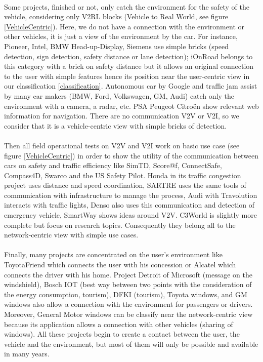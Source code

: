 \documentclass[a4paper]{article}
\begin{document}
\paragraph{}Some projects, finished or not, only catch the environment for the safety of the vehicle, considering only V2RL blocks (Vehicle to Real World, see figure \ref{VehicleCentric}). Here, we do not have a connection with the environment or other vehicles, it is just a view of the environment by the car. For instance, Pioneer, Intel, BMW Head-up-Display, Siemens use simple bricks (speed detection, sign detection, safety distance or lane detection); iOnRoad belongs to this category with a brick on safety distance but it allows an original connection to the user with simple features hence its position near the user-centric view in our classification \ref{classification}. Autonomous car by Google and traffic jam assist by many car makers (BMW, Ford, Volkswagen, GM, Audi) catch only the environment with a camera, a radar, etc. PSA Peugeot Citro\"en show relevant web information for navigation. There are no communication V2V or V2I, so we consider that it is a vehicle-centric view with simple bricks of detection.

\paragraph{}Then all field operational tests on V2V and V2I work on basic use case (see figure \ref{VehicleCentric}) in order to show the utility of the communication between cars on safety and traffic efficiency like SimTD, Score@f, ConnectSafe, Compass4D, Swarco and the US Safety Pilot. Honda in its traffic congestion project uses distance and speed coordination, SARTRE uses the same tools of communication with infrastructure to manage the process, Audi with Travolution interacts with traffic lights, Denso also uses this communication and detection of emergency vehicle, SmartWay shows ideas around V2V. C3World is slightly more complete but focus on research topics. Consequently they belong all to the network-centric view with simple use cases.

\paragraph{}Finally, many projects are concentrated on the user's environment like ToyotaFriend which connects the user with his concession or Alcatel which connects the driver with his home. Project Detroit of Microsoft (message on the windshield), Bosch IOT (best way between two points with the consideration of the energy consumption, tourism), DFKI (tourism), Toyota windows, and GM windows also allow a connection with the environment for passengers or drivers. Moreover, General Motor windows can be classify near the network-centric view because its application allows a connection with other vehicles (sharing of windows). All these projects begin to create a contact between the user, the vehicle and the environment, but most of them will only be possible and available in many years.
\end{document}
